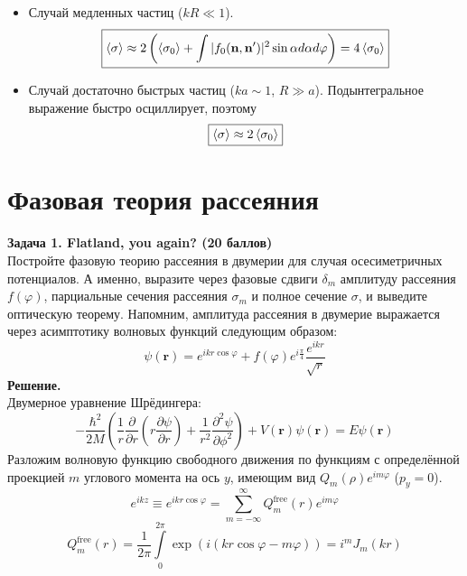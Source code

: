 \documentclass[12pt]{article}
\theoremstyle{definition}
\begin{document}
\begin{itemize}
    \item Случай медленных частиц ($kR\ll1$).
    \begin{equation}
        \boxed{\braket{\sigma}\approx2\left(\braket{\sigma_0}+\int|f_0(\textbf{n},\textbf{n}')|^2\sin\alpha d\alpha d\varphi\right)=4\braket{\sigma_0}}
    \end{equation}
    \item Случай достаточно быстрых частиц ($ka\sim1$, $R\gg a$). Подынтегральное выражение быстро осциллирует, поэтому
    \begin{equation}
        \boxed{\braket{\sigma}\approx2\braket{\sigma_0}}
    \end{equation}
\end{itemize}
\section{Фазовая теория рассеяния}
\textbf{Задача 1. Flatland, you again? (20 баллов)}\\
Постройте фазовую теорию рассеяния в двумерии для случая осесиметричных потенциалов. А именно, выразите через
фазовые сдвиги $\delta_m$ амплитуду рассеяния $f(\varphi)$, парциальные сечения рассеяния $\sigma_m$ и полное сечение $\sigma$, и выведите оптическую теорему.
Напомним, амплитуда рассеяния в двумерие выражается через асимптотику волновых функций следующим образом:
\begin{equation}
    \psi(\textbf{r})=e^{ikr\cos\varphi}+f(\varphi)e^{i\frac{\pi}{4}}\frac{e^{ikr}}{\sqrt{r}}
\end{equation}
\textbf{Решение.}\\
Двумерное уравнение Шрёдингера:
\begin{equation}
    -\frac{\hbar^2}{2M}\left(\frac{1}{r}\frac{\partial}{\partial r}\left(r\frac{\partial\psi}{\partial r}\right)+\frac{1}{r^2}\frac{\partial^2\psi}{\partial\phi^2}\right)+V(\textbf{r})\psi(\textbf{r})=E\psi(\textbf{r})
\end{equation}
Разложим волновую функцию свободного движения по функциям с определённой проекцией $m$ углового момента на ось $y$, имеющим вид $Q_m(\rho)e^{im\varphi}$ ($p_y=0$).
\begin{equation}
    e^{ikz}\equiv e^{ikr\cos\varphi}=\sum\limits_{m=-\infty}^\infty Q^\text{free}_m(r)e^{im\varphi}
\end{equation}
\begin{equation}
    Q^\text{free}_m(r)=\frac{1}{2\pi}\int\limits_0^{2\pi}\exp(i(kr\cos\varphi-m\varphi))=i^mJ_m(kr)
\end{equation}
\end{document}
